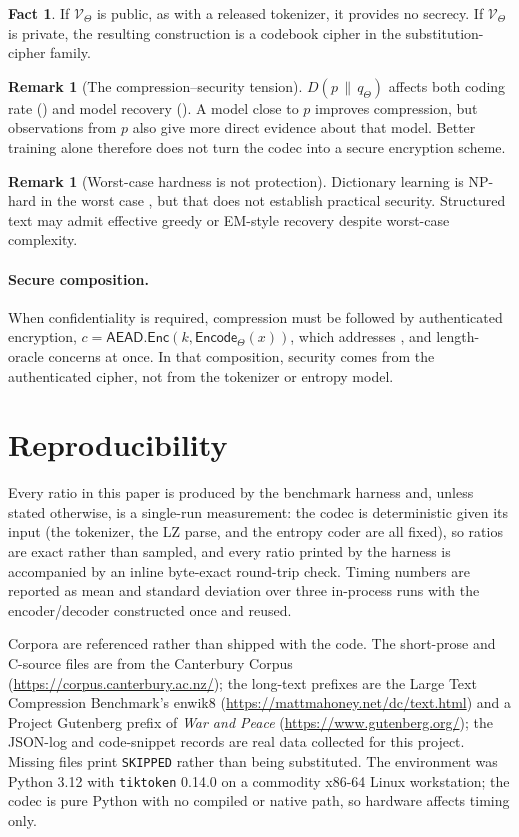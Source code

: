 \documentclass[10pt,twocolumn]{article}
\theoremstyle{plain}
\theoremstyle{definition}
\newtheorem{remark}[theorem]{Remark}
\newtheorem{fact}[theorem]{Fact}
\newcommand{\V}{\mathcal{V}}
\newcommand{\KL}[2]{D\!\left(#1 \,\|\, #2\right)}
\begin{document}
\begin{fact}
If $\V_\Theta$ is public, as with a released tokenizer, it provides no secrecy. If
$\V_\Theta$ is private, the resulting construction is a codebook cipher in the
substitution-cipher family.
\end{fact}

\begin{remark}[The compression--security tension]
$\KL{p}{q_\Theta}$ affects both coding rate () and model recovery
(). A model close to $p$ improves compression, but observations from
$p$ also give more direct evidence about that model. Better training alone therefore
does not turn the codec into a secure encryption scheme.
\end{remark}

\begin{remark}[Worst-case hardness is not protection]
Dictionary learning is NP-hard in the worst case \cite{gribonval2015}, but that does
not establish practical security. Structured text may admit effective greedy or
EM-style recovery despite worst-case complexity.
\end{remark}

\paragraph{Secure composition.} When confidentiality is required, compression must be
followed by authenticated encryption,
$c = \mathsf{AEAD.Enc}(k, \mathsf{Encode}_\Theta(x))$, which addresses
,  and length-oracle concerns at once. In that
composition, security comes from the authenticated cipher, not from the tokenizer or
entropy model.

\section{Reproducibility}\label{sec:repro}

Every ratio in this paper is produced by the benchmark harness and, unless stated
otherwise, is a single-run measurement: the codec is deterministic given its input (the
tokenizer, the LZ parse, and the entropy coder are all fixed), so ratios are exact rather
than sampled, and every ratio printed by the harness is accompanied by an inline byte-exact
round-trip check. Timing numbers are reported as mean and standard deviation over three
in-process runs with the encoder/decoder constructed once and reused.

Corpora are referenced rather than shipped with the code. The short-prose and C-source
files are from the Canterbury Corpus
(\url{https://corpus.canterbury.ac.nz/}); the long-text prefixes are the Large Text
Compression Benchmark's enwik8 (\url{https://mattmahoney.net/dc/text.html}) and a
Project Gutenberg prefix of \emph{War and Peace} (\url{https://www.gutenberg.org/});
the JSON-log and code-snippet records are real data collected for this project.
Missing files print
\texttt{SKIPPED} rather than being substituted. The environment was Python 3.12 with
\texttt{tiktoken} 0.14.0 on a commodity x86-64 Linux workstation; the codec is pure
Python with no compiled or native path, so hardware affects timing only.

\end{document}
